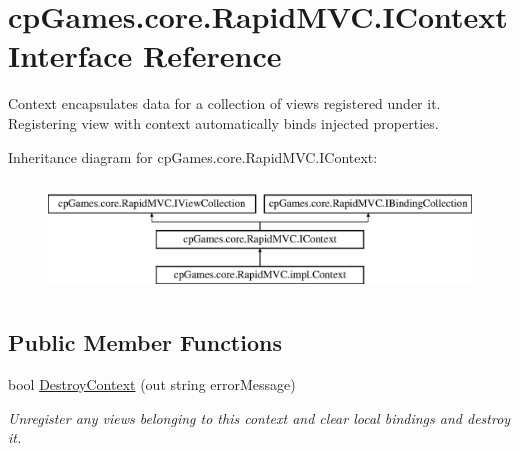 \hypertarget{interfacecp_games_1_1core_1_1_rapid_m_v_c_1_1_i_context}{}\section{cp\+Games.\+core.\+Rapid\+M\+V\+C.\+I\+Context Interface Reference}
\label{interfacecp_games_1_1core_1_1_rapid_m_v_c_1_1_i_context}


Context encapsulates data for a collection of views registered under it. Registering view with context automatically binds injected properties.  


Inheritance diagram for cp\+Games.\+core.\+Rapid\+M\+V\+C.\+I\+Context\+:\begin{figure}[H]
\begin{center}
\leavevmode
\includegraphics[height=3.000000cm]{interfacecp_games_1_1core_1_1_rapid_m_v_c_1_1_i_context}
\end{center}
\end{figure}
\subsection*{Public Member Functions}
\begin{DoxyCompactItemize}
\item 
bool \mbox{\hyperlink{interfacecp_games_1_1core_1_1_rapid_m_v_c_1_1_i_context_ad0fae0753ef27d6972af6cdddabbec0d}{Destroy\+Context}} (out string error\+Message)
\begin{DoxyCompactList}\small\item\em Unregister any views belonging to this context and clear local bindings and destroy it. \end{DoxyCompactList}\end{DoxyCompactItemize}
